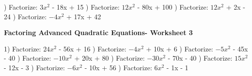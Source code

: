 \documentclass{article}%
\begin{document}
) Factorize: $3x^2$ - 18x + 15%
\newline%
\newline%
) Factorize: $12x^2$ - 80x + 100%
\newline%
\newline%
) Factorize: $12x^2$ + 2x - 24%
\newline%
\newline%
) Factorize: $-4x^2$ + 17x + 42%
\newline%
\newline%
\newline%
\pagebreak%
\large%
\begin{center}%
\textbf{Factoring Advanced Quadratic Equations- Worksheet 3}%
\newline%
\newline%
\newline%
\end{center} \normalsize%
1) Factorize: $24x^2$ - 56x + 16%
\newline%
\newline%
) Factorize: $-4x^2$ + 10x + 6%
\newline%
\newline%
) Factorize: $-5x^2$ - 45x - 40%
\newline%
\newline%
) Factorize: $-10x^2$ + 20x + 80%
\newline%
\newline%
) Factorize: $-30x^2$ - 70x - 40%
\newline%
\newline%
) Factorize: $15x^2$ - 12x - 3%
\newline%
\newline%
) Factorize: $-6x^2$ - 10x + 56%
\newline%
\newline%
) Factorize: $6x^2$ - 1x - 1%
\newline%
\newline%
\newline%
\end{document}

